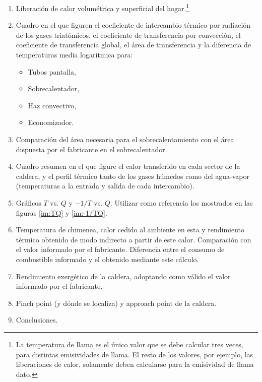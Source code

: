 \begin{enumerate}
    \item Liberación de calor volumétrica y superficial del hogar.\footnote{La temperatura de llama es el único valor que se debe calcular tres veces, para distintas emisividades de llama. El resto de los valores, por ejemplo, las liberaciones de calor, solamente deben calcularse para la emisividad de llama dato.}
    
    \item Cuadro en el que figuren el coeficiente de intercambio térmico por radiación de los gases triatómicos, el coeficiente de transferencia por convección, el coeficiente de transferencia global, el área de transferencia y la diferencia de temperaturas media logarítmica para:
    \begin{itemize}
        \item Tubos pantalla,
        \item Sobrecalentador,
        \item Haz convectivo,
        \item Economizador.
    \end{itemize}
    
    \item Comparación del área necesaria para el sobrecalentamiento con el área dispuesta por el fabricante en el sobrecalentador.
    
    \item Cuadro resumen en el que figure el calor transferido en cada sector de la caldera, y el perfil térmico tanto de los gases húmedos como del agua-vapor (temperaturas a la entrada y salida de cada intercambio).
    
    \item Gráficos $T$ vs. $Q$ y $-1/T$ vs. $Q$. Utilizar como referencia los mostrados en las figuras \ref{im:TQ} y \ref{im:-1/TQ}.
    
    \item Temperatura de chimenea, calor cedido al ambiente en esta y rendimiento térmico obtenido de modo indirecto a partir de este calor. Comparación con el valor informado por el fabricante. Diferencia entre el consumo de combustible informado y el obtenido mediante este cálculo.
    
    \item Rendimiento exergético de la caldera, adoptando como válido el valor informado por el fabricante.
    
    \item Pinch point (y dónde se localiza) y approach point de la caldera.
    
    \item Conclusiones.

\end{enumerate}

